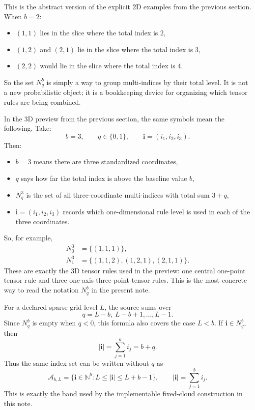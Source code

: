 \documentclass[11pt]{article}
\numberwithin{equation}{section}
\begin{document}
This is the abstract version of the explicit 2D examples from the previous
section.  When \(b=2\):
\begin{itemize}[leftmargin=0.28in]
  \item \((1,1)\) lies in the slice where the total index is \(2\),
  \item \((1,2)\) and \((2,1)\) lie in the slice where the total index is
  \(3\),
  \item \((2,2)\) would lie in the slice where the total index is \(4\).
\end{itemize}
So the set \(N_q^b\) is simply a way to group multi-indices by their total
level.  It is not a new probabilistic object; it is a bookkeeping device for
organizing which tensor rules are being combined.

In the 3D preview from the previous section, the same symbols mean the following.
Take:
\begin{equation}
  b=3,
  \qquad
  q\in\{0,1\},
  \qquad
  \mathbf i=(i_1,i_2,i_3).
  \label{eq:p38-3d-index-symbols}
\end{equation}
Then:
\begin{itemize}[leftmargin=0.28in]
  \item \(b=3\) means there are three standardized coordinates,
  \item \(q\) says how far the total index is above the baseline value \(b\),
  \item \(N_q^3\) is the set of all three-coordinate multi-indices with total
  sum \(3+q\),
  \item \(\mathbf i=(i_1,i_2,i_3)\) records which one-dimensional rule level is
  used in each of the three coordinates.
\end{itemize}
So, for example,
\begin{align}
  N_0^3 &= \{(1,1,1)\},
  \label{eq:p38-N03}\\
  N_1^3 &= \{(1,1,2),(1,2,1),(2,1,1)\}.
  \label{eq:p38-N13}
\end{align}
These are exactly the 3D tensor rules used in the preview: one central
one-point tensor rule and three one-axis three-point tensor rules.  This is the
most concrete way to read the notation \(N_q^b\) in the present note.

For a declared sparse-grid level \(L\), the source sums over
\[
  q=L-b,\ L-b+1,\ldots,L-1.
\]
Since \(N_q^b\) is empty when \(q<0\), this formula also covers the case
\(L<b\).  If \(\mathbf i\in N_q^b\), then
\begin{equation}
  |\mathbf i|=\sum_{j=1}^b i_j=b+q.
  \label{eq:p32-index-sum-q}
\end{equation}
Thus the same index set can be written without \(q\) as
\begin{equation}
  \mathcal A_{b,L}
  =
  \{\mathbf i\in\mathbb N^b: L\le |\mathbf i|\le L+b-1\},
  \qquad |\mathbf i|=\sum_{j=1}^b i_j.
  \label{eq:p31-level-band}
\end{equation}
This is exactly the band used by the implementable fixed-cloud construction in
this note.
\end{document}
